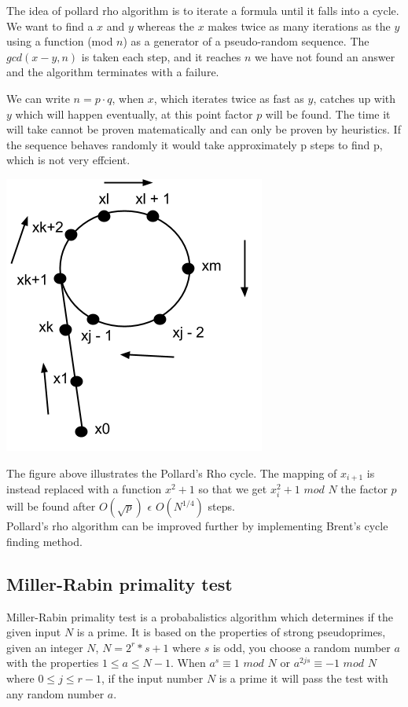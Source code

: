 The idea of pollard rho algorithm is to iterate a formula until it falls into a cycle. We want to find a $x$ and $y$ whereas the $x$ makes twice as many iterations as the $y$ using a function (mod $n$) as a generator of a pseudo-random sequence. The $gcd(x - y, n)$ is taken each step, and it reaches $n$ we have not found an answer and the algorithm terminates with a failure.

We can write $n = p \cdot q$, when $x$, which iterates twice as fast as $y$, catches up with $y$ which will happen eventually, at this point factor $p$ will be found. The time it will take cannot be proven matematically and can only be proven by heuristics. If the sequence behaves randomly it would take approximately p steps to find p, which is not very effcient. \cite{avalg} 

\includegraphics[scale = 0.5]{pollards.png}

The figure above illustrates the Pollard's Rho cycle. The mapping of $x_{i+1}$ is instead replaced with a function $x^2+1$ so that we get $x^2_{i}+1$  $mod$ $N$ the factor $p$ will be found after $O(\sqrt{p})$  $\epsilon$ $O(N^{1/4})$ steps. \cite{avalg}\\

Pollard's rho algorithm can be improved further by implementing Brent's cycle finding method. \cite{brent}

\subsection{Miller-Rabin primality test}
Miller-Rabin primality test is a probabalistics algorithm which determines if the given input $N$ is a prime. It is based on the properties of strong pseudoprimes, given an integer $N$, $N = 2^r * s + 1$ where $s$ is odd, you choose a random number $a$ with the properties $1 \leq a \leq N - 1$. When $a^s \equiv 1$ $mod$ $N$ or $a^{2js} \equiv - 1$ $mod$ $N$ where $0 \leq j \leq r - 1$, if the input number $N$ is a prime it will pass the test with any random number $a$.

